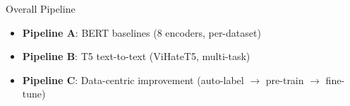 \documentclass[10pt, aspectratio=169]{beamer}
\begin{document}
\begin{frame}[shrink=10]{Overall Pipeline}
\begin{center}
{
    }%
  \end{center}
  \vspace{0.1cm}
  \begin{itemize}
    \item \textbf{Pipeline A}: BERT baselines (8 encoders, per-dataset)
    \item \textbf{Pipeline B}: T5 text-to-text (ViHateT5, multi-task)
    \item \textbf{Pipeline C}: Data-centric improvement (auto-label $\rightarrow$ pre-train $\rightarrow$ fine-tune)
  \end{itemize}
\end{frame}

\end{document}
